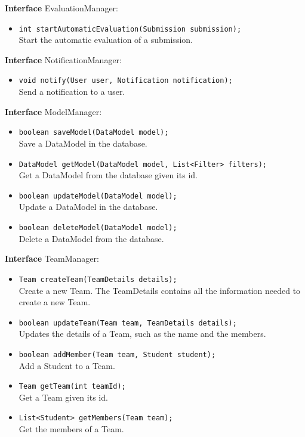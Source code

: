 \textbf{Interface} EvaluationManager:
\begin{itemize}
    \item \texttt{int startAutomaticEvaluation(Submission submission);}
    \\ Start the automatic evaluation of a submission.
\end{itemize}

\textbf{Interface} NotificationManager:
\begin{itemize}
    \item \texttt{void notify(User user, Notification notification);}
    \\ Send a notification to a user.
\end{itemize}

\textbf{Interface} ModelManager:
\begin{itemize}
    \item \texttt{boolean saveModel(DataModel model);}
    \\ Save a DataModel in the database.
    \item \texttt{DataModel getModel(DataModel model, List<Filter> filters);}
    \\ Get a DataModel from the database given its id.
    \item \texttt{boolean updateModel(DataModel model);}
    \\ Update a DataModel in the database.
    \item \texttt{boolean deleteModel(DataModel model);}
    \\ Delete a DataModel from the database.
\end{itemize}

\textbf{Interface} TeamManager:
\begin{itemize}
    \item \texttt{Team createTeam(TeamDetails details);}
    \\ Create a new Team. The TeamDetails contains all the information needed to create a new Team.
    \item \texttt{boolean updateTeam(Team team, TeamDetails details);}
    \\ Updates the details of a Team, such as the name and the members.
    \item \texttt{boolean addMember(Team team, Student student);}
    \\ Add a Student to a Team.
    \item \texttt{Team getTeam(int teamId);}
    \\ Get a Team given its id.
    \item \texttt{List<Student> getMembers(Team team);}
    \\ Get the members of a Team.
\end{itemize}
